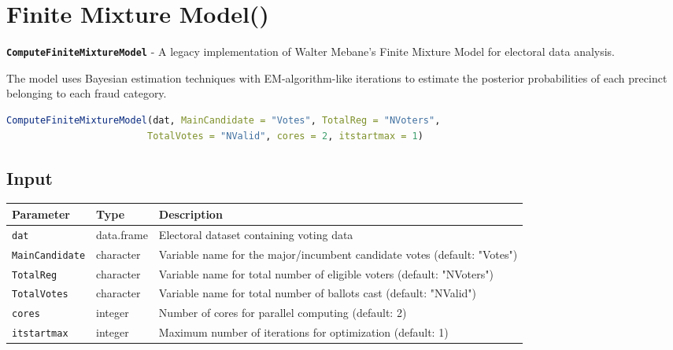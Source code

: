 \documentclass{article}
\begin{document}
\section{Finite Mixture Model()}

\textbf{\texttt{ComputeFiniteMixtureModel}} - A legacy implementation of Walter Mebane's Finite Mixture Model for electoral data analysis.

The model uses Bayesian estimation techniques with EM-algorithm-like iterations to estimate the posterior probabilities of each precinct belonging to each fraud category.

\begin{center}
\end{center}

\begin{lstlisting}[language=R]
ComputeFiniteMixtureModel(dat, MainCandidate = "Votes", TotalReg = "NVoters", 
                         TotalVotes = "NValid", cores = 2, itstartmax = 1)
\end{lstlisting}

\subsection{Input}
\begin{longtable}{p{3cm}p{3cm}p{8cm}}
\toprule
\textbf{Parameter} & \textbf{Type} & \textbf{Description} \\
\midrule
\texttt{dat} & data.frame & Electoral dataset containing voting data \\
\texttt{MainCandidate} & character & Variable name for the major/incumbent candidate votes (default: "Votes") \\
\texttt{TotalReg} & character & Variable name for total number of eligible voters (default: "NVoters") \\
\texttt{TotalVotes} & character & Variable name for total number of ballots cast (default: "NValid") \\
\texttt{cores} & integer & Number of cores for parallel computing (default: 2) \\
\texttt{itstartmax} & integer & Maximum number of iterations for optimization (default: 1) \\
\bottomrule
\end{longtable}
\end{document}
